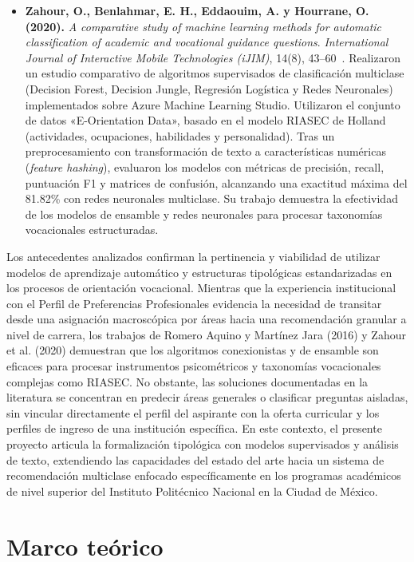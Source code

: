 \begin{itemize}
    \item \textbf{Zahour, O., Benlahmar, E. H., Eddaouim, A. y Hourrane, O. (2020).} \textit{A comparative study of machine learning methods for automatic classification of academic and vocational guidance questions}. \textit{International Journal of Interactive Mobile Technologies (iJIM)}, 14(8), 43--60~\cite{Zahour2020}. Realizaron un estudio comparativo de algoritmos supervisados de clasificación multiclase (Decision Forest, Decision Jungle, Regresión Logística y Redes Neuronales) implementados sobre Azure Machine Learning Studio. Utilizaron el conjunto de datos «E-Orientation Data», basado en el modelo RIASEC de Holland (actividades, ocupaciones, habilidades y personalidad). Tras un preprocesamiento con transformación de texto a características numéricas (\textit{feature hashing}), evaluaron los modelos con métricas de precisión, recall, puntuación F1 y matrices de confusión, alcanzando una exactitud máxima del 81.82\% con redes neuronales multiclase. Su trabajo demuestra la efectividad de los modelos de ensamble y redes neuronales para procesar taxonomías vocacionales estructuradas.
\end{itemize}

Los antecedentes analizados confirman la pertinencia y viabilidad de utilizar modelos de aprendizaje automático y estructuras tipológicas estandarizadas en los procesos de orientación vocacional. Mientras que la experiencia institucional con el Perfil de Preferencias Profesionales evidencia la necesidad de transitar desde una asignación macroscópica por áreas hacia una recomendación granular a nivel de carrera, los trabajos de Romero Aquino y Martínez Jara (2016) y Zahour et al. (2020) demuestran que los algoritmos conexionistas y de ensamble son eficaces para procesar instrumentos psicométricos y taxonomías vocacionales complejas como RIASEC. No obstante, las soluciones documentadas en la literatura se concentran en predecir áreas generales o clasificar preguntas aisladas, sin vincular directamente el perfil del aspirante con la oferta curricular y los perfiles de ingreso de una institución específica. En este contexto, el presente proyecto articula la formalización tipológica con modelos supervisados y análisis de texto, extendiendo las capacidades del estado del arte hacia un sistema de recomendación multiclase enfocado específicamente en los programas académicos de nivel superior del Instituto Politécnico Nacional en la Ciudad de México.

\section{Marco teórico}


